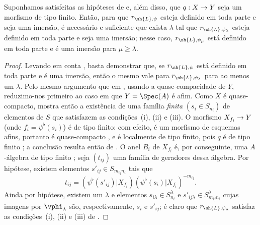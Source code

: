 \documentclass[oneside,10pt]{amsart}
\makeatletter
\renewcommand{\geq}{\geqslant}
\newcommand{\ega@arrow}[2]{\mathchoice{#1}{#2}{#2}{#2}}
\renewcommand{\to}{\ega@arrow{\longrightarrow}{\rightarrow}}
\newcommand{\oldpage}[2][]{\marginnote{\normalfont\footnotesize\textbf{#1}~|~#2}\ignorespaces}
\let\EGAOriginalLabel\label
\renewcommand{\label}[1]{\phantomsection\EGAOriginalLabel{#1}}
\makeatother
\begin{document}
\begin{proposition}[3.8.4]
\label{II.3.8.4}
Suponhamos satisfeitas as hipóteses de  e, além disso, que $q:X\to Y$ seja um morfismo de tipo finito.
Então, para que $r_{\sh{L},\psi}$ esteja definido em toda parte e seja uma imersão, é necessário e suficiente que exista $\lambda$ tal que $r_{\sh{L},\psi_\lambda}$ esteja definido em toda parte e seja uma imersão;
nesse caso, $r_{\sh{L},\psi_\mu}$ está definido em toda parte e é uma imersão para $\mu\geq\lambda$.
\end{proposition}
\oldpage[II]{70}
\begin{proof}
Levando em conta , basta demonstrar que, se $r_{\sh{L},\psi}$ está definido em toda parte e é uma imersão, então o mesmo vale para $r_{\sh{L},\psi_\lambda}$ para ao menos um $\lambda$.
Pelo mesmo argumento que em , usando a quase-compacidade de $Y$, reduzimo-nos primeiro ao caso em que $Y=\Spec(A)$ é afim.
Como $X$ é quase-compacto,  mostra então a existência de uma família \emph{finita} $(s_i\in S_{n_i})$ de elementos de $S$ que satisfazem as condições~(i), (ii) e (iii).
O morfismo $X_{f_i}\to Y$ (onde $f_i=\psi^\flat(s_i)$) é de tipo finito: com efeito, é um morfismo de esquemas afins, portanto é quase-compacto , e é localmente de tipo finito, pois $q$ é de tipo finito ; a conclusão resulta então de .
O anel $B_i$ de $X_{f_i}$ é, por conseguinte, uma $A$-álgebra de tipo finito ;
seja $(t_{ij})$ uma família de geradores dessa álgebra.
Por hipótese, existem elementos $s'_{ij}\in S_{m_{ij}n_i}$ tais que
\[
  t_{ij} = (\psi^\flat(s'_{ij})|X_{f_i})(\psi^\flat(s_i)|X_{f_i})^{-m_{ij}}.
\]
Ainda por hipótese, existem um $\lambda$ e elementos $s_{i\lambda}\in S_{n_i}^\lambda$ e $s'_{ij\lambda}\in S_{m_{ij}n_i}^\lambda$ cujas imagens por $\vphi_\lambda$ são, respectivamente, $s_i$ e $s'_{ij}$;
é claro que $r_{\sh{L},\psi_\lambda}$ satisfaz as condições~(i), (ii) e (iii) de .
\end{proof}
\end{document}
